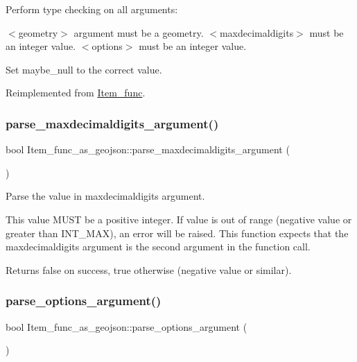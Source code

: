 Perform type checking on all arguments\+:

$<$geometry$>$ argument must be a geometry. $<$maxdecimaldigits$>$ must be an integer value. $<$options$>$ must be an integer value.

Set maybe\+\_\+null to the correct value. 

Reimplemented from \mbox{\hyperlink{classItem__func}{Item\+\_\+func}}.

\mbox{\label{classItem__func__as__geojson_a3cafd9620dbcc041154c7f57c349ad3d}} 
\subsubsection{\texorpdfstring{parse\+\_\+maxdecimaldigits\+\_\+argument()}{parse\_maxdecimaldigits\_argument()}}
{\footnotesize\ttfamily bool Item\+\_\+func\+\_\+as\+\_\+geojson\+::parse\+\_\+maxdecimaldigits\+\_\+argument (\begin{DoxyParamCaption}{ }\end{DoxyParamCaption})}

Parse the value in maxdecimaldigits argument.

This value M\+U\+ST be a positive integer. If value is out of range (negative value or greater than I\+N\+T\+\_\+\+M\+AX), an error will be raised. This function expects that the maxdecimaldigits argument is the second argument in the function call.

\begin{DoxyReturn}{Returns}
false on success, true otherwise (negative value or similar). 
\end{DoxyReturn}
\mbox{\label{classItem__func__as__geojson_a9b8654280ee07ffb07a25643f31ff0db}} 
\subsubsection{\texorpdfstring{parse\+\_\+options\+\_\+argument()}{parse\_options\_argument()}}
{\footnotesize\ttfamily bool Item\+\_\+func\+\_\+as\+\_\+geojson\+::parse\+\_\+options\+\_\+argument (\begin{DoxyParamCaption}{ }\end{DoxyParamCaption})}


